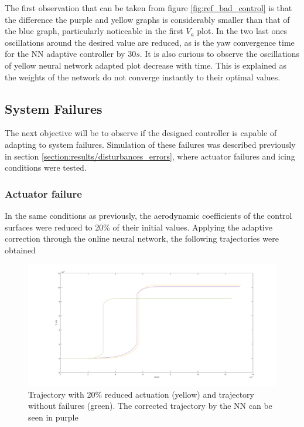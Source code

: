 The first observation that can be taken from figure \ref{fig:ref_bad_control} is that the difference the purple and yellow graphs is considerably smaller than that of the blue graph, particularly noticeable in the first $V_a$ plot. In the two last ones oscillations around the desired value are reduced, as is the yaw convergence time for the NN adaptive controller by $30s$.
It is also curious to observe the oscillations of yellow neural network adapted plot decrease with time. This is explained as the weights of the network do not converge instantly to their optimal values.


\subsection{System Failures}

The next objective will be to observe if the designed controller is capable of adapting to system failures. Simulation of these failures was described previously in section \ref{section:results/disturbances_errors}, where actuator failures and icing conditions were tested. 

\subsubsection{Actuator failure}

In the same conditions as previously, the aerodynamic coefficients of the control surfaces were reduced to 20\% of their initial values. Applying the adaptive correction through the online neural network, the following trajectories were obtained

\begin{figure}[H]
\centering
\includegraphics[width=\textwidth]{Figures/Results/reduced_act_NN.png}
\caption[Trajectory with reduced actuation corrected with NN correction]{Trajectory with 20\% reduced actuation (yellow) and trajectory without failures (green). The corrected trajectory by the NN can be seen in purple}
\label{fig:reduced_act_NN}
\end{figure}

